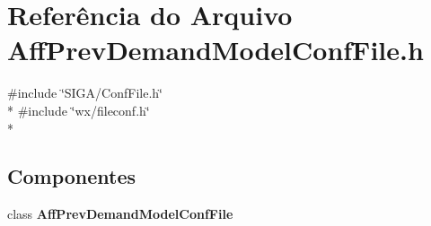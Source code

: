 \section{Referência do Arquivo Aff\+Prev\+Demand\+Model\+Conf\+File.\+h}
\label{_aff_prev_demand_model_conf_file_8h}
{\ttfamily \#include \char`\"{}S\+I\+G\+A/\+Conf\+File.\+h\char`\"{}}\\*
{\ttfamily \#include \char`\"{}wx/fileconf.\+h\char`\"{}}\\*
\subsection*{Componentes}
\begin{DoxyCompactItemize}
\item 
class {\bf Aff\+Prev\+Demand\+Model\+Conf\+File}
\end{DoxyCompactItemize}
